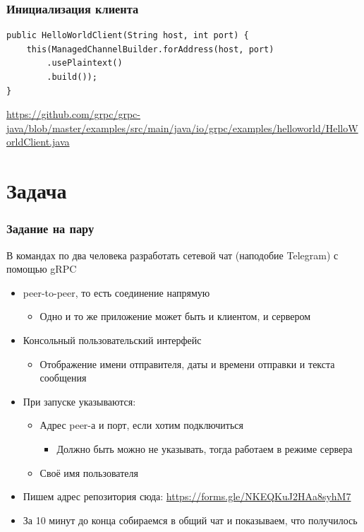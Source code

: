 \documentclass[xetex,mathserif,serif]{beamer}
\begin{document}
    \begin{frame}[fragile]
        \frametitle{Инициализация клиента}
        \begin{verbatim}
public HelloWorldClient(String host, int port) {
    this(ManagedChannelBuilder.forAddress(host, port)
        .usePlaintext()
        .build());
}
        \end{verbatim}
        \vspace{5mm}
        \url{https://github.com/grpc/grpc-java/blob/master/examples/src/main/java/io/grpc/examples/helloworld/HelloWorldClient.java}
    \end{frame}

    \section{Задача}

    \begin{frame}
        \frametitle{Задание на пару}
        \begin{footnotesize}
            В командах по два человека разработать сетевой чат (наподобие Telegram) с помощью gRPC
            \begin{itemize}
                \item peer-to-peer, то есть соединение напрямую
                \begin{itemize}
                    \item Одно и то же приложение может быть и клиентом, и сервером
                \end{itemize}
                \item Консольный пользовательский интерфейс
                \begin{itemize}
                    \item Отображение имени отправителя, даты и времени отправки и текста сообщения
                \end{itemize}
                \item При запуске указываются:
                \begin{itemize}
                    \item Адрес peer-а и порт, если хотим подключиться
                    \begin{itemize}
                        \item Должно быть можно не указывать, тогда работаем в режиме сервера
                    \end{itemize}
                    \item Своё имя пользователя
                \end{itemize}
                \item Пишем адрес репозитория сюда: \url{https://forms.gle/NKEQKuJ2HAa8syhM7}
                \item За 10 минут до конца собираемся в общий чат и показываем, что получилось
            \end{itemize}
        \end{footnotesize}
    \end{frame}
\end{document}
